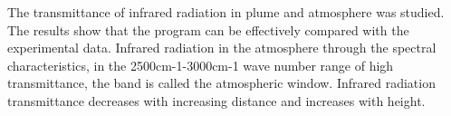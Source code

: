 \begin{enabstract}
 The transmittance of infrared radiation in plume and atmosphere was studied. The results show that the program can be effectively compared with the experimental data. Infrared radiation in the atmosphere through the spectral characteristics, in the 2500cm-1-3000cm-1 wave number range of high transmittance, the band is called the atmospheric window. Infrared radiation transmittance decreases with increasing distance and increases with height.
 
\end{enabstract}

